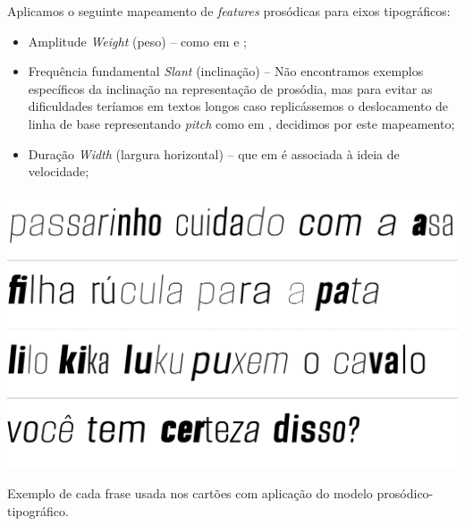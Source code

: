 \documentclass[a4paper]{tufte-handout}
\begin{document}

Aplicamos o seguinte mapeamento de \textit{features} prosódicas para eixos tipográficos:

\begin{itemize}
    \item Amplitude \enskip \textrightarrow \enskip \textit{Weight} (peso) -- como em \citet{wolfel2015} e \citet{bessemans2017};
    
    
    \item Frequência fundamental \enskip \textrightarrow \enskip \textit{Slant} (inclinação) -- Não encontramos exemplos específicos da inclinação na representação de prosódia, mas para evitar as dificuldades teríamos em textos longos caso replicássemos o deslocamento de linha de base representando \textit{pitch} como em \citep{bessemans2017}, decidimos por este mapeamento;
    
    \item Duração \enskip \textrightarrow \enskip \textit{Width} (largura horizontal) -- que em \citet{van2006towards} é associada à ideia de velocidade;
\end{itemize}

\begin{marginfigure}[0.05\baselineskip]
  \includegraphics{imgs/exemplos-frases-2.png}
  \caption{Exemplo de cada frase usada nos cartões com aplicação do modelo prosódico-tipográfico.}
  \label{exemplo_frases}
\end{marginfigure}
\end{document}
